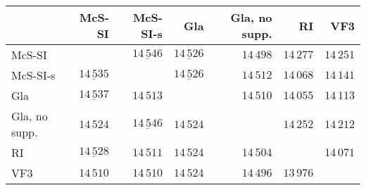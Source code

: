 
\begin{tabular}{lrrrrrr}
    \toprule

 & McS-SI & McS-SI-s & Gla & Gla, no supp. & RI & VF3 \\

    \midrule

\rule{0pt}{2.3ex}McS-SI &  & $\underline{14\,546}$ & $\underline{14\,526}$ & $14\,498$ & $14\,277$ & $14\,251$ \\
\rule{0pt}{2.3ex}McS-SI-s & $\underline{14\,535}$ &  & $\underline{14\,526}$ & $14\,512$ & $14\,068$ & $14\,141$ \\
\rule{0pt}{2.3ex}Gla & $\underline{14\,537}$ & $14\,513$ &  & $14\,510$ & $14\,055$ & $14\,113$ \\
\rule{0pt}{2.3ex}Gla, no supp. & $14\,524$ & $\underline{14\,546}$ & $14\,524$ &  & $14\,252$ & $14\,212$ \\
\rule{0pt}{2.3ex}RI & $\underline{14\,528}$ & $14\,511$ & $14\,524$ & $14\,504$ &  & $14\,071$ \\
\rule{0pt}{2.3ex}VF3 & $14\,510$ & $14\,510$ & $14\,524$ & $14\,496$ & $13\,976$ &  \\

    \bottomrule
\end{tabular}

